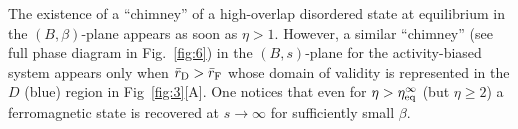 \documentclass{iopart}
\newcommand{\eqref}[1]{(\ref{#1})}
\begin{document}


The existence of a ``chimney'' of a high-overlap disordered state at equilibrium in the $(B,\beta)$-plane appears as soon as $\eta>1$. However, a similar ``chimney'' (see full phase diagram in Fig.~\ref{fig:6}) in the $(B,s)$-plane for the activity-biased system appears only when $\bar{r}_{\rm D} > \bar{r}_{\rm F}$ whose domain of validity is represented in the $D$ (blue) region in Fig~\ref{fig:3}[A]. One notices that even for $\eta > \eta_{\rm eq}^{\infty}$ (but $\eta\geqslant 2$) a ferromagnetic state is recovered at $s\to\infty$ for sufficiently small $\beta$.
\end{document}
